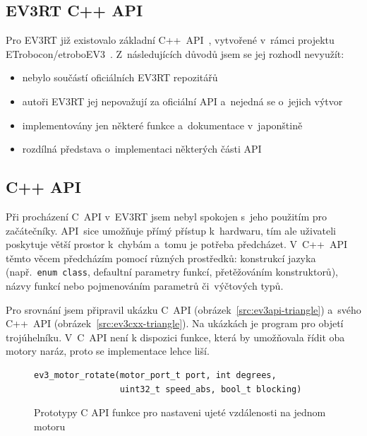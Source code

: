 \subsection{EV3RT C++ API}


Pro EV3RT již existovalo základní C++~API~\cite{EV3RT-git-web_documentation}, vytvořené v~rámci projektu ETrobocon/etroboEV3~\cite{ev3rt-cpp-API-ETrobocon}. Z~následujících důvodů jsem se jej rozhodl nevyužít:
 
\begin{itemize}
    \item nebylo součástí oficiálních EV3RT repozitářů
    \item autoři EV3RT jej nepovažují za oficiální API a~nejedná se o~jejich výtvor
    \item implementovány jen některé funkce a~dokumentace v~japonštině
    \item rozdílná představa o~implementaci některých části API     
\end{itemize}

\subsection{C++ API}

Při procházení C~API v~EV3RT jsem nebyl spokojen s~jeho použitím pro začátečníky. 
API~sice umožňuje přímý přístup k~hardwaru, tím ale uživateli poskytuje větší prostor k~chybám a~tomu
 je potřeba předcházet. 
V~C++~API těmto věcem předcházím pomocí různých prostředků: konstrukcí jazyka (např.~\texttt{enum class}, defaultní parametry funkcí, přetěžováním konstruktorů), názvy funkcí nebo pojmenováním parametrů či~výčtových typů.

Pro srovnání jsem připravil ukázku C~API (obrázek~\ref{src:ev3api-triangle}) a~svého C++~API (obrázek~\ref{src:ev3cxx-triangle}). 
Na ukázkách je program pro objetí trojúhelníku. V~C~API není k dispozici funkce, která by umožňovala řídit oba motory naráz, proto se implementace lehce liší.


\begin{figure}[H] 
    \begin{verbatim}
ev3_motor_rotate(motor_port_t port, int degrees, 
                 uint32_t speed_abs, bool_t blocking)
    \end{verbatim}
    \caption{Prototypy C API funkce pro nastaveni ujeté vzdálenosti na jednom motoru}
    \label{src:ev3api_motor-rotate}
\end{figure}

